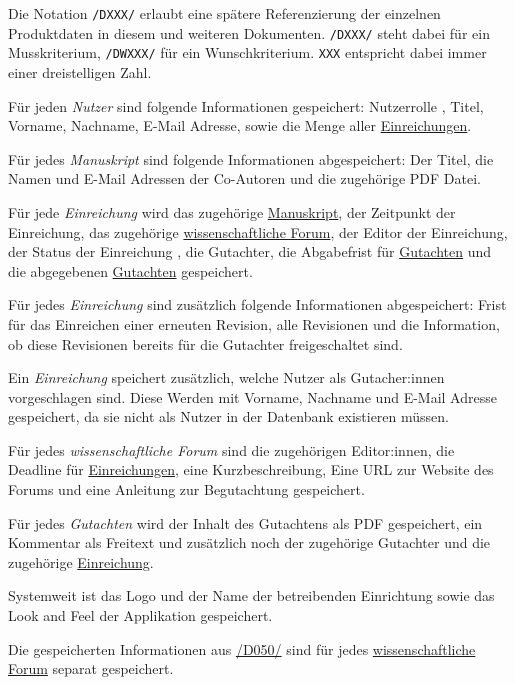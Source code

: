 
Die Notation \texttt{/DXXX/} erlaubt eine spätere Referenzierung der einzelnen Produktdaten in diesem und weiteren
Dokumenten. \texttt{/DXXX/} steht dabei für ein Musskriterium, \texttt{/DWXXX/} für ein Wunschkriterium. \texttt{XXX} entspricht dabei immer einer dreistelligen Zahl.

\begin{description}
	 Für jeden \emph{Nutzer} sind folgende Informationen gespeichert: Nutzerrolle , Titel, Vorname, Nachname, E-Mail Adresse, sowie die Menge aller \hyperref[d025]{Einreichungen}.
	
	 Für jedes \emph{Manuskript} sind folgende Informationen abgespeichert: Der Titel, die Namen und E-Mail Adressen der Co-Autoren und die zugehörige PDF Datei. 
	
	 Für jede \emph{Einreichung} wird das zugehörige \hyperref[d020]{Manuskript}, der Zeitpunkt der Einreichung, das zugehörige \hyperref[d030]{wissenschaftliche Forum}, der Editor  der Einreichung, der Status der Einreichung , die Gutachter, die Abgabefrist für \hyperref[d040]{Gutachten} und die abgegebenen \hyperref[d040]{Gutachten} gespeichert.
	
	 Für jedes \emph{Einreichung} sind zusätzlich folgende Informationen abgespeichert: Frist für das Einreichen einer erneuten Revision, alle Revisionen  und die Information, ob diese Revisionen bereits für die Gutachter freigeschaltet sind.
	
	 Ein \emph{Einreichung} speichert zusätzlich, welche Nutzer als Gutacher:innen vorgeschlagen sind. Diese Werden mit Vorname, Nachname und E-Mail Adresse gespeichert, da sie nicht als Nutzer in der Datenbank existieren müssen.
	
	 Für jedes \emph{wissenschaftliche Forum} sind die zugehörigen Editor:innen, die Deadline für \hyperref[d025]{Einreichungen}, eine Kurzbeschreibung, Eine URL zur Website des Forums und eine Anleitung zur Begutachtung gespeichert.
	
	 Für jedes \emph{Gutachten} wird der Inhalt des Gutachtens als PDF gespeichert, ein Kommentar als Freitext und zusätzlich noch der zugehörige Gutachter  und die zugehörige \hyperref[d025]{Einreichung}.
	
	 Systemweit ist das Logo und der Name der betreibenden Einrichtung sowie das Look and Feel der Applikation gespeichert.
	
	 Die gespeicherten Informationen aus \hyperref[d050]{/D050/} sind für jedes \hyperref[d030]{wissenschaftliche Forum} separat gespeichert.
\end{description}